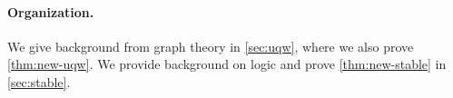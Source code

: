 \paragraph{Organization.} We give background from graph theory in \cref{sec:uqw}, where we also
prove \cref{thm:new-uqw}. 
We provide background 
on logic and prove \cref{thm:new-stable} in \cref{sec:stable}. 



